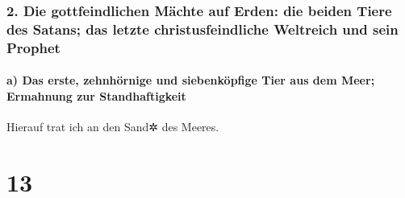 \hypertarget{die-gottfeindlichen-muxe4chte-auf-erden-die-beiden-tiere-des-satans-das-letzte-christusfeindliche-weltreich-und-sein-prophet}{%
\subsubsection{2. Die gottfeindlichen Mächte auf Erden: die beiden Tiere
des Satans; das letzte christusfeindliche Weltreich und sein
Prophet}\label{die-gottfeindlichen-muxe4chte-auf-erden-die-beiden-tiere-des-satans-das-letzte-christusfeindliche-weltreich-und-sein-prophet}}

\hypertarget{a-das-erste-zehnhuxf6rnige-und-siebenkuxf6pfige-tier-aus-dem-meer-ermahnung-zur-standhaftigkeit}{%
\paragraph{a) Das erste, zehnhörnige und siebenköpfige Tier aus dem
Meer; Ermahnung zur
Standhaftigkeit}\label{a-das-erste-zehnhuxf6rnige-und-siebenkuxf6pfige-tier-aus-dem-meer-ermahnung-zur-standhaftigkeit}}

 Hierauf trat ich an den Sand✲ des Meeres.

\hypertarget{section-12}{%
\section{13}\label{section-12}}

